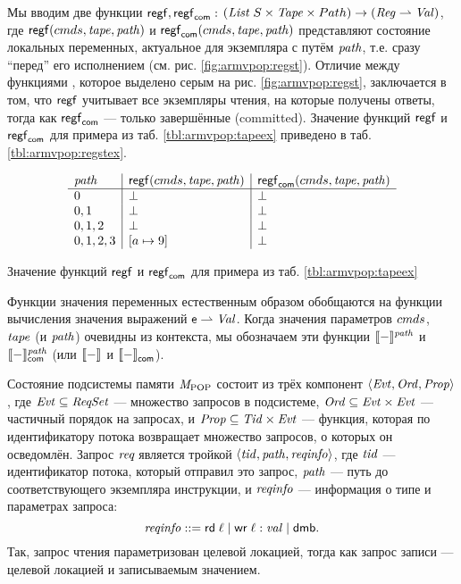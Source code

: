 Мы вводим две функции
$\mathsf{regf}, \mathsf{regf}_\mathsf{com}:$
$(\mathit{List}\;{S} \times \mathit{Tape} \times Path) \rightarrow (\mathit{Reg} \rightharpoonup \mathit{Val})$,
где $\mathsf{regf}({cmds},\mathit{tape},\mathit{path})$ и $\mathsf{regf}_\mathsf{com}({cmds},\mathit{tape},\mathit{path})$
представляют состояние локальных переменных, актуальное для экземпляра с путём $\mathit{path}$,
т.е. сразу ``перед'' его исполнением (см. рис. \ref{fig:armvpop:regst}).
Отличие между функциями , которое выделено серым на рис. \ref{fig:armvpop:regst},
заключается в том, что $\mathsf{regf}$ учитывает все экземпляры чтения,
на которые получены ответы, тогда как $\mathsf{regf}_\mathsf{com}$ --- только завершённые (committed).
Значение функций $\mathsf{regf}$ и $\mathsf{regf}_\mathsf{com}$ для примера из таб. \ref{tbl:armvpop:tapeex}
приведено в таб. \ref{tbl:armvpop:regstex}.

\begin{table}
\[
\begin{array}{l | l | l}
\mathit{path} & \mathsf{regf}({cmds}, \mathit{tape}, \mathit{path}) & \mathsf{regf}_\mathsf{com}({cmds}, \mathit{tape}, \mathit{path})\\
\hline
 0       & \bot & \bot \\
 0,1     & \bot & \bot \\
 0,1,2   & \bot & \bot  \\
 0,1,2,3 & [a \mapsto 9] & \bot \\
\end{array}
\]
  \caption{Значение функций $\mathsf{regf}$ и $\mathsf{regf}_\mathsf{com}$ для примера из таб. \ref{tbl:armvpop:tapeex}}
  \label{tbl:armvpop:regstex}
\end{table}

Функции значения переменных естественным образом обобщаются на функции вычисления
значения выражений $\mathsf{e} \rightharpoonup \mathit{Val}$.
Когда значения параметров ${cmds}$, $\mathit{tape}$ (и $\mathit{path}$) очевидны из контекста,
мы обозначаем эти функции $\llbracket-\rrbracket ^{\mathit{path}}$ и $\llbracket-\rrbracket ^{\mathit{path}}_\mathsf{com}$
(или $\llbracket-\rrbracket ^{}$ и $\llbracket-\rrbracket ^{}_\mathsf{com}$).

Состояние подсистемы памяти $\mathit{M}_{\mathrm{POP}}$ состоит из трёх компонент $\langle  \mathit{Evt}, \mathit{Ord}, \mathit{Prop}  \rangle$, где
$\mathit{Evt} \subseteq \mathit{ReqSet}$ --- множество запросов в подсистеме,
$\mathit{Ord} \subseteq \mathit{Evt} \times \mathit{Evt}$ --- частичный порядок на запросах, и
$\mathit{Prop} \subseteq  \mathit{Tid} \times \mathit{Evt}$ --- функция, которая по идентификатору потока возвращает
множество запросов, о которых он осведомлён.
Запрос $\textit{req}$ является тройкой $\langle \mathit{tid}, \mathit{path}, \mathit{reqinfo} \rangle$, где
$\mathit{tid}$ --- идентификатор потока, который отправил это запрос,
$\mathit{path}$ --- путь до соответствующего экземпляра инструкции, и
$\mathit{reqinfo}$ --- информация о типе и параметрах запроса:
\[ \mathit{reqinfo} ::= {\sf rd} \; \ell \mid {\sf wr} \; \ell:\mathit{val} \mid {\sf dmb}.\]
Так, запрос чтения параметризован целевой локацией, тогда как запрос записи --- целевой
локацией и записываемым значением.

